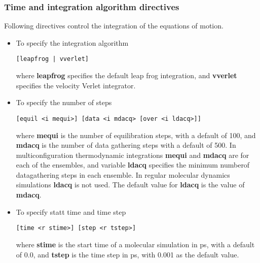 \subsubsection{Time and integration algorithm directives}
Following directives control the integration of the equations of motion.
\begin{itemize}
\item
To specify the integration algorithm
\begin{verbatim}
[leapfrog | vverlet]
\end{verbatim}
where {\bf leapfrog} specifies the default leap frog integration, and
{\bf vverlet} specifies the velocity Verlet integrator.
\item
To specify the number of steps
\begin{verbatim}
[equil <i mequi>] [data <i mdacq> [over <i ldacq>]]
\end{verbatim}
where {\bf mequi} is the number of equilibration steps, with a default
of 100, and {\bf mdacq} is the number of data gathering steps with a
default of 500. In multiconfiguration thermodynamic integrations
{\bf mequi} and {\bf mdacq} are for each of the ensembles, and
variable {\bf ldacq} specifies the minimum numberof datagathering steps 
in each ensemble. In regular molecular dynamics simulations {\bf ldacq}
is not used. The default value for {\bf ldacq} is the value of {\bf mdacq}.
\item
To specify statt time and time step
\begin{verbatim}
[time <r stime>] [step <r tstep>]
\end{verbatim}
where {\bf stime} is the start time of a molecular simulation in ps,
with a default of 0.0, and {\bf tstep} is the time step in ps, with
0.001 as the default value.
\end{itemize}
